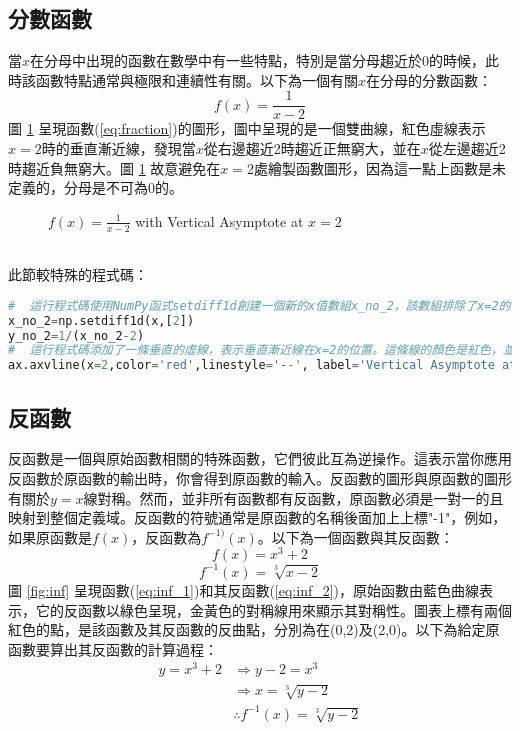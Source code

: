 \documentclass[12pt, a4paper]{article}
\begin{document}
\subsection{分數函數}
當$x$在分母中出現的函數在數學中有一些特點，特別是當分母趨近於0的時候，此時該函數特點通常與極限和連續性有關。以下為一個有關$x$在分母的分數函數：
\begin{equation}\label{eq:fraction}
f(x)= \frac{1}{x - 2}
\end{equation}
圖 \ref{fig:fraction} 呈現函數(\ref{eq:fraction})的圖形，圖中呈現的是一個雙曲線，紅色虛線表示$x=2$時的垂直漸近線，發現當$x$從右邊趨近2時趨近正無窮大，並在$x$從左邊趨近2時趨近負無窮大。圖 \ref{fig:fraction} 故意避免在$x=2$處繪製函數圖形，因為這一點上函數是未定義的，分母是不可為0的。
\begin{figure}[h]
    \caption{$f(x) = \frac{1}{x - 2}$ with Vertical Asymptote at $x=2$}
    \label{fig:fraction}
\end{figure}\\
此節較特殊的程式碼：
\begin{lstlisting}[language=Python]
#  這行程式碼使用NumPy函式setdiff1d創建一個新的x值數組x_no_2，該數組排除了x=2的值。這是為了避免分母為零，因為在x=2時，分母等於零，這會導致無定義的情況。
x_no_2=np.setdiff1d(x,[2])
y_no_2=1/(x_no_2-2)
#  這行程式碼添加了一條垂直的虛線，表示垂直漸近線在x=2的位置。這條線的顏色是紅色，並且使用虛線樣式。同時，它的標籤說明了這是在 x=2 的位置的垂直漸近線。
ax.axvline(x=2,color='red',linestyle='--', label='Vertical Asymptote at x=2')
\end{lstlisting}
\subsection{反函數}
反函數是一個與原始函數相關的特殊函數，它們彼此互為逆操作。這表示當你應用反函數於原函數的輸出時，你會得到原函數的輸入。反函數的圖形與原函數的圖形有關於$y=x$線對稱。然而，並非所有函數都有反函數，原函數必須是一對一的且映射到整個定義域。反函數的符號通常是原函數的名稱後面加上上標"-1"，例如，如果原函數是$f(x)$，反函數為$f^{-1)}(x)$。以下為一個函數與其反函數：
\begin{equation}\label{eq:inf_1}
f(x)=x^3+2
\end{equation}
\begin{equation}\label{eq:inf_2}
f^{-1}(x)=\sqrt[3]{x - 2}
\end{equation}
圖 \ref{fig:inf} 呈現函數(\ref{eq:inf_1})和其反函數(\ref{eq:inf_2})，原始函數由藍色曲線表示，它的反函數以綠色呈現，金黃色的對稱線用來顯示其對稱性。圖表上標有兩個紅色的點，是該函數及其反函數的反曲點，分別為在(0,2)及(2,0)。以下為給定原函數要算出其反函數的計算過程：
\begin{align*}
y=x^3+2
&\Rightarrow y-2=x^3\\
&\Rightarrow x=\sqrt[3]{y-2}\\
&\therefore f^{-1}(x)=\sqrt[3]{y-2}\\
\end{align*}
\end{document}
